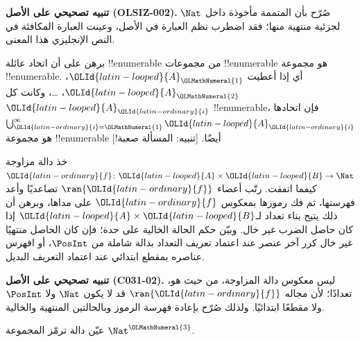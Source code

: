 \documentclass[../../../include/open-logic-section]{subfiles}
\begin{document}
\begin{editorial}
\textbf{تنبيه تصحيحي على الأصل (OLSIZ-002).} صُرّح بأن المتممة مأخوذة
داخل $\Nat$ لجزئية منتهية منها؛ فقد اضطرب نظم العبارة في الأصل،
وعينت العبارة المكافئة في النص الإنجليزي هذا المعنى.
\end{editorial}

\begin{prob}
برهن على أن اتحاد عائلة !!{enumerable} من مجموعات !!{enumerable}
هو مجموعة !!{enumerable}. أي إذا أعطيت $\OLId{latin-looped}{A}_\OLMathNumeral{1}$، $\OLId{latin-looped}{A}_\OLMathNumeral{2}$، \dots{}، وكانت كل
$\OLId{latin-looped}{A}_\OLId{latin-ordinary}{i}$ !!{enumerable}، فإن اتحادها $\bigcup_{\OLId{latin-ordinary}{i}=\OLMathNumeral{1}}^\infty
\OLId{latin-looped}{A}_\OLId{latin-ordinary}{i}$ هو مجموعة !!{enumerable} أيضًا. [تنبيه: المسألة صعبة!]
\end{prob}

\begin{prob}
خذ دالة مزاوجة $\OLId{latin-ordinary}{f} \colon \OLId{latin-looped}{A} \times \OLId{latin-looped}{B} \to \Nat$ كيفما اتفقت.
رتّب أعضاء $\ran{\OLId{latin-ordinary}{f}}$ تصاعديًا وأعد فهرستها، ثم فك رموزها بمعكوس $\OLId{latin-ordinary}{f}$
على مداها، وبرهن أن ذلك يتيح بناء تعداد لـ$\OLId{latin-looped}{A} \times \OLId{latin-looped}{B}$ إذا كان حاصل
الضرب غير خال. وبيّن حكم الحالة الخالية على حدة؛ فإن كان الحاصل منتهيًا
غير خال كرر آخر عنصر عند اعتماد تعريف التعداد بدالة شاملة من $\PosInt$،
أو افهرس عناصره بمقطع ابتدائي عند اعتماد التعريف البديل.
\end{prob}

\textbf{تنبيه تصحيحي على الأصل (C031-02).} ليس معكوس دالة المزاوجة، من حيث هو،
تعدادًا؛ لأن مجاله $\ran{\OLId{latin-ordinary}{f}}$ قد لا يكون $\Nat$ ولا $\PosInt$ ولا مقطعًا
ابتدائيًا. ولذلك صُرّح بإعادة فهرسة الرموز وبالحالتين المنتهية والخالية.

\begin{prob}
عيّن دالة ترمّز المجموعة $\Nat^\OLMathNumeral{3}$.
\end{prob}
\end{document}
